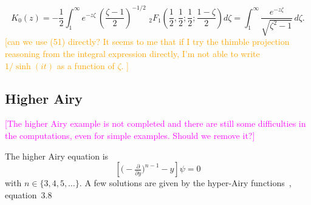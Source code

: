 \documentclass{article}
\theoremstyle{definition}
\begin{document}
\begin{equation}
    K_0(z)=-\frac{1}{2}\int_1^\infty e^{-z\zeta} \, \left(\frac{\zeta-1}{2}\right)^{-1/2} \,\, {}_2F_1\left(\frac{1}{2}, \frac{1}{2};\frac{1}{2};\frac{1-\zeta}{2}\right)  d\zeta =  \int_1^\infty \frac{e^{-z\zeta}}{\sqrt{\zeta^2-1}} \, d\zeta .
\end{equation}
\textcolor{orange}{[can we use (51) directly? It seems to me that if I try the thimble projection reasoning from the integral expression directly, I'm not able to write $1/\sinh(it)$ as a function of $\zeta$. ]}

\subsection{Higher Airy}

\textcolor{magenta}{[The higher Airy example is not completed and there are still some difficulties in the computations, even for simple examples. Should we remove it?]}

The higher Airy equation is
\begin{equation}\label{eqn:higher-airy}
\left[\big({-}\tfrac{\partial}{\partial y}\big)^{n-1} - y\right] \psi = 0
\end{equation}
with $n \in \{3, 4, 5, \ldots\}$. A few solutions are given by the hyper-Airy functions~\cite{charbonnier22}, equation~3.8
\end{document}
